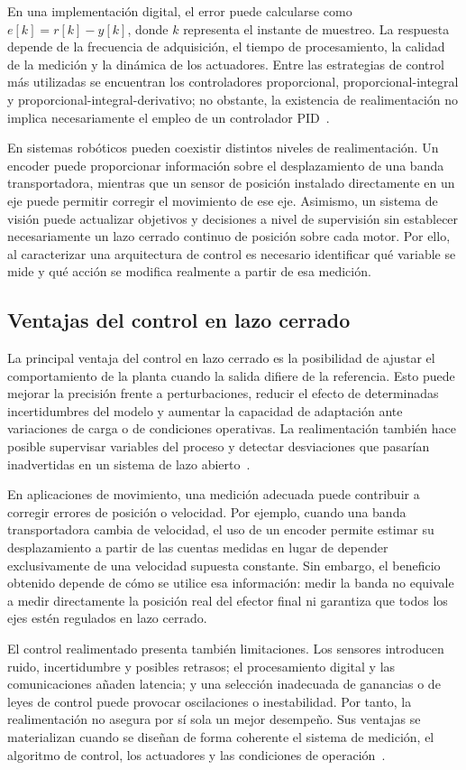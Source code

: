 En una implementación digital, el error puede calcularse como $e[k]=r[k]-y[k]$, donde $k$ representa el instante de muestreo. La respuesta depende de la frecuencia de adquisición, el tiempo de procesamiento, la calidad de la medición y la dinámica de los actuadores. Entre las estrategias de control más utilizadas se encuentran los controladores proporcional, proporcional-integral y proporcional-integral-derivativo; no obstante, la existencia de realimentación no implica necesariamente el empleo de un controlador PID~\cite{franklin2010feedback}.

En sistemas robóticos pueden coexistir distintos niveles de realimentación. Un encoder puede proporcionar información sobre el desplazamiento de una banda transportadora, mientras que un sensor de posición instalado directamente en un eje puede permitir corregir el movimiento de ese eje. Asimismo, un sistema de visión puede actualizar objetivos y decisiones a nivel de supervisión sin establecer necesariamente un lazo cerrado continuo de posición sobre cada motor. Por ello, al caracterizar una arquitectura de control es necesario identificar qué variable se mide y qué acción se modifica realmente a partir de esa medición.

\subsection{Ventajas del control en lazo cerrado}
La principal ventaja del control en lazo cerrado es la posibilidad de ajustar el comportamiento de la planta cuando la salida difiere de la referencia. Esto puede mejorar la precisión frente a perturbaciones, reducir el efecto de determinadas incertidumbres del modelo y aumentar la capacidad de adaptación ante variaciones de carga o de condiciones operativas. La realimentación también hace posible supervisar variables del proceso y detectar desviaciones que pasarían inadvertidas en un sistema de lazo abierto~\cite{astrom2020feedback}.

En aplicaciones de movimiento, una medición adecuada puede contribuir a corregir errores de posición o velocidad. Por ejemplo, cuando una banda transportadora cambia de velocidad, el uso de un encoder permite estimar su desplazamiento a partir de las cuentas medidas en lugar de depender exclusivamente de una velocidad supuesta constante. Sin embargo, el beneficio obtenido depende de cómo se utilice esa información: medir la banda no equivale a medir directamente la posición real del efector final ni garantiza que todos los ejes estén regulados en lazo cerrado.

El control realimentado presenta también limitaciones. Los sensores introducen ruido, incertidumbre y posibles retrasos; el procesamiento digital y las comunicaciones añaden latencia; y una selección inadecuada de ganancias o de leyes de control puede provocar oscilaciones o inestabilidad. Por tanto, la realimentación no asegura por sí sola un mejor desempeño. Sus ventajas se materializan cuando se diseñan de forma coherente el sistema de medición, el algoritmo de control, los actuadores y las condiciones de operación~\cite{franklin2010feedback,nise2015control}.
